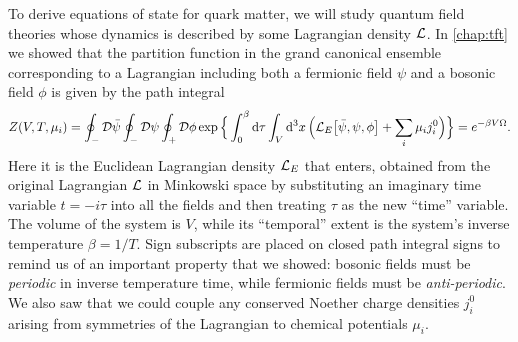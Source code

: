 To derive equations of state for quark matter, we will study quantum field theories whose dynamics is described by some Lagrangian density $\mathcal{L}$.
In \cref{chap:tft} we showed that the partition function in the grand canonical ensemble corresponding to a Lagrangian including both a fermionic field $\psi$ and a bosonic field $\phi$ is given by the path integral
\begin{equation}
	Z(V, T, \mu_i) = \oint_- \mathcal{D} \bar{\psi} \oint_- \mathcal{D} \psi \oint_+ \mathcal{D} \phi \exp \Big\{ \int_0^\beta \mathop{}\!\mathrm{d} \tau \int_V \mathop{}\!\mathrm{d}^3 x \, \Big( \mathcal{L}_E\big[\bar{\psi}, \psi, \phi\big] + \sum_i \mu_i j^0_i \Big) \Big\} = e^{-\beta V \Omega} .
\label{eq:master_intro:partition_function}
\end{equation}
Here it is the Euclidean Lagrangian density $\mathcal{L}_E$ that enters,
obtained from the original Lagrangian $\mathcal{L}$ in Minkowski space by substituting an imaginary time variable $t = -i \tau$ into all the fields and then treating $\tau$ as the new ``time'' variable.
The volume of the system is $V$, while its ``temporal'' extent is the system's inverse temperature $\beta = 1/T$.
Sign subscripts are placed on closed path integral signs to remind us of an important property that we showed: bosonic fields must be \emph{periodic} in inverse temperature time, while fermionic fields must be \emph{anti-periodic}.
We also saw that we could couple any conserved Noether charge densities $j^0_i$ arising from symmetries of the Lagrangian to chemical potentials $\mu_i$.

